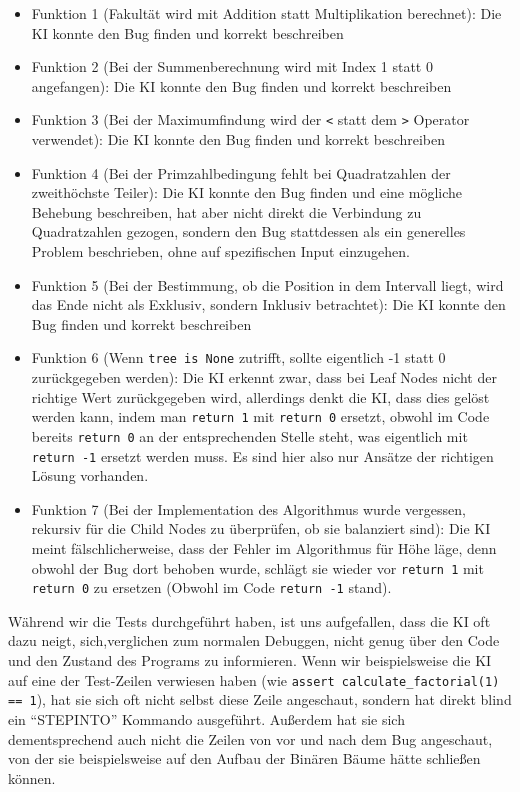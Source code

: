 \documentclass[a4paper,12pt,ngerman]{scrartcl}
\begin{document}
\begin{itemize}
	\item Funktion 1 (Fakultät wird mit Addition statt Multiplikation berechnet): Die KI konnte den Bug finden und korrekt beschreiben
	\item Funktion 2 (Bei der Summenberechnung wird mit Index 1 statt 0 angefangen): Die KI konnte den Bug finden und korrekt beschreiben
	\item Funktion 3 (Bei der Maximumfindung wird der \texttt{<} statt dem \texttt{>} Operator verwendet): Die KI konnte den Bug finden und korrekt beschreiben
	\item Funktion 4 (Bei der Primzahlbedingung fehlt bei Quadratzahlen der zweithöchste Teiler): Die KI konnte den Bug finden und eine mögliche Behebung beschreiben, hat aber nicht direkt die Verbindung zu Quadratzahlen gezogen, sondern den Bug stattdessen als ein generelles Problem beschrieben, ohne auf spezifischen Input einzugehen.
	\item Funktion 5 (Bei der Bestimmung, ob die Position in dem Intervall liegt, wird das Ende nicht als Exklusiv, sondern Inklusiv betrachtet): Die KI konnte den Bug finden und korrekt beschreiben
	\item Funktion 6 (Wenn \texttt{tree is None} zutrifft, sollte eigentlich -1 statt 0 zurückgegeben werden): Die KI erkennt zwar, dass bei Leaf Nodes nicht der richtige Wert zurückgegeben wird, allerdings denkt die KI, dass dies gelöst werden kann, indem man \texttt{return 1} mit \texttt{return 0} ersetzt, obwohl im Code bereits \texttt{return 0} an der entsprechenden Stelle steht, was eigentlich mit \texttt{return -1} ersetzt werden muss. Es sind hier also nur Ansätze der richtigen Lösung vorhanden.
	\item Funktion 7 (Bei der Implementation des Algorithmus wurde vergessen, rekursiv für die Child Nodes zu überprüfen, ob sie balanziert sind): Die KI meint fälschlicherweise, dass der Fehler im Algorithmus für Höhe läge, denn obwohl der Bug dort behoben wurde, schlägt sie wieder vor \texttt{return 1} mit \texttt{return 0} zu ersetzen (Obwohl im Code \texttt{return -1} stand).
\end{itemize}

Während wir die Tests durchgeführt haben, ist uns aufgefallen, dass die KI oft dazu neigt, sich,verglichen zum normalen Debuggen, nicht genug über den Code und den Zustand des Programs zu informieren. Wenn wir beispielsweise die KI auf eine der Test-Zeilen verwiesen haben (wie \texttt{assert calculate_factorial(1) == 1}), hat sie sich oft nicht selbst diese Zeile angeschaut, sondern hat direkt blind ein ``STEPINTO'' Kommando ausgeführt. Außerdem hat sie sich dementsprechend auch nicht die Zeilen von vor und nach dem Bug angeschaut, von der sie beispielsweise auf den Aufbau der Binären Bäume hätte schließen können.
\end{document}
